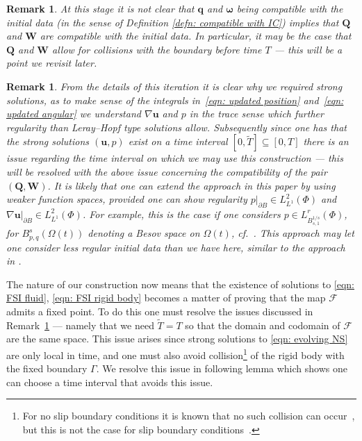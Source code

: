 \documentclass[a4paper]{amsart}
\numberwithin{equation}{section}
\newcommand{\grad}{\nabla}
\theoremstyle{plain}
\newtheorem{remark}[theorem]{Remark}
\newcommand{\mbf}[1]{\mathbf{#1}}
\begin{document}
\begin{remark}
\label{remark: construction}
At this stage it is not clear that $\mbf{q}$ and $\boldsymbol{\omega}$ being compatible with the initial data (in the sense of Definition \ref{defn: compatible with IC}) implies that $\mbf{Q}$ and $\boldsymbol{W}$ are compatible with the initial data.
In particular, it may be the case that $\mbf{Q}$ and $\mbf{W}$ allow for collisions with the boundary before time $T$ --- this will be a point we revisit later.
\end{remark}

\begin{remark}
    \label{remark: regularity}
    From the details of this iteration it is clear why we required strong solutions, as to make sense of the integrals in~\eqref{eqn: updated position} and~\eqref{eqn: updated angular} we understand $\grad \mbf{u} $ and $p$ in the trace sense which further regularity than Leray--Hopf type solutions allow.
        Subsequently since one has that the strong solutions $(\mbf{u},p) $ exist on a time interval $[0,\widetilde{T}] \subseteq [0,T]$ there is an issue regarding the time interval on which we may use this construction --- this will be resolved with the above issue concerning the compatibility of the pair $(\mbf{Q}, \mbf{W})$.
        It is likely that one can extend the approach in this paper by using weaker function spaces, provided one can show regularity $p|_{\partial B} \in L^2_{L^1}(\Phi)$ and $\grad \mbf{u}|_{\partial B} \in L^2_{L^1}(\Phi)$.
        For example, this is the case if one considers $p \in L^r_{B^{1/s}_{s,1}}(\Phi)$, for $B^s_{p,q}(\Omega(t))$ denoting a Besov space on $\Omega(t)$, cf.~\cite[Chapter 7]{adams2003sobolev}.
        This approach may let one consider less regular initial data than we have here, similar to the approach in \cite{geissert2013Lp}.
\end{remark}

The nature of our construction now means that the existence of solutions to \eqref{eqn: FSI fluid}, \eqref{eqn: FSI rigid body} becomes a matter of proving that the map $\mathscr{F}$ admits a fixed point.
To do this one must resolve the issues discussed in Remark~\ref{remark: construction} --- namely that we need $\widetilde{T} = T$ so that the domain and codomain of $\mathscr{F}$ are the same space.
This issue arises since strong solutions to \eqref{eqn: evolving NS} are only local in time, and one must also avoid collision\footnote{For no slip boundary conditions it is known that no such collision can occur~\cite{hillairet2007lack,hillairet2009collisions,san2002global}, but this is not the case for slip boundary conditions~\cite{chemetov2017motion}.} of the rigid body with the fixed boundary $\Gamma$.
We resolve this issue in following lemma which shows one can choose a time interval that avoids this issue.
\end{document}
